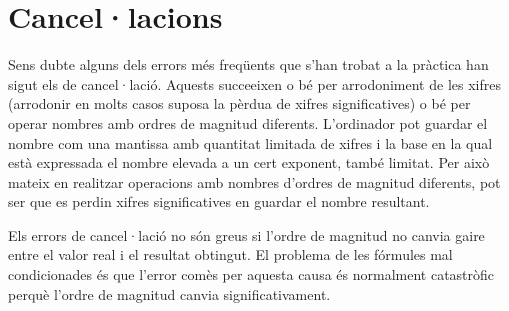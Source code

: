 \documentclass[a4paper,10.4pt]{article}
\begin{document}
\section{Cancel·lacions}

Sens dubte alguns dels errors més freqüents que s'han trobat a la pràctica han sigut els de cancel·lació. Aquests succeeixen o bé per arrodoniment de les xifres (arrodonir en molts casos suposa la pèrdua de xifres significatives) o bé per operar nombres amb ordres de magnitud diferents. L'ordinador pot guardar el nombre com una mantissa amb quantitat limitada de xifres i la base en la qual està expressada el nombre elevada a un cert exponent, també limitat. Per això mateix en realitzar operacions amb nombres d'ordres de magnitud diferents, pot ser que es perdin xifres significatives en guardar el nombre resultant.

Els errors de cancel·lació no són greus si l'ordre de magnitud no canvia gaire entre el valor real i el resultat obtingut. El problema de les fórmules mal condicionades és que l'error comès per aquesta causa és normalment catastròfic perquè l'ordre de magnitud canvia significativament.   
\end{document}

